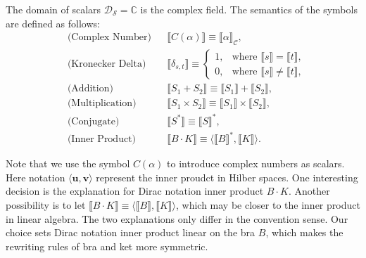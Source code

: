 \documentclass[manuscript, review, timestamp]{acmart}
\newcommand*{\sem}[1]{{\llbracket #1 \rrbracket}}
\begin{document}
\begin{definition}
  The domain of scalars $\mathcal{D}_\mathcal{S} = \mathbb{C}$ is the complex field.
  The semantics of the symbols are defined as follows:
  \begin{align*}
    & \text{(Complex Number)} &&
    \sem{C(\alpha)} \equiv \sem{\alpha}_\mathcal{C}, \\
    & \text{(Kronecker Delta)} &&
    \sem{\delta_{s, t}} \equiv \left\{
      \begin{array}{ll}
        1, & \text{where } \sem{s} = \sem{t}, \\
        0, & \text{where } \sem{s} \neq \sem{t}, 
      \end{array}
    \right. \\
    & \text{(Addition)} &&
    \sem{S_1 + S_2} \equiv \sem{S_1} + \sem{S_2}, \\
    & \text{(Multiplication)} &&
    \sem{S_1 \times S_2} \equiv \sem{S_1} \times \sem{S_2}, \\
    & \text{(Conjugate)} &&
    \sem{S^*} \equiv \sem{S}^*, \\
    & \text{(Inner Product)} &&
    \sem{B \cdot K} \equiv \langle \sem{B}^*, \sem{K} \rangle.
  \end{align*}
\end{definition}

Note that we use the symbol $C(\alpha)$ to introduce complex numbers as scalars.
Here notation $\langle \boldsymbol{u} , \boldsymbol{v} \rangle$ represent the inner proudct in Hilber spaces.
One interesting decision is the explanation for Dirac notation inner product $B \cdot K$. Another possibility is to let $\sem{B \cdot K} \equiv \langle \sem{B}, \sem{K} \rangle$, which may be closer to the inner product in linear algebra. The two explanations only differ in the convention sense. Our choice sets Dirac notation inner product linear on the bra $B$, which makes the rewriting rules of bra and ket more symmetric.
\end{document}

